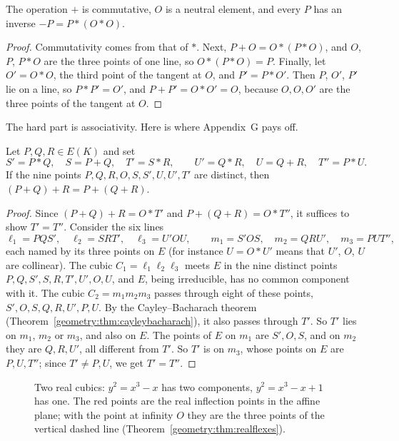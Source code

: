 \begin{proposition}\label{geometry:prop:groupbasic}
The operation $+$ is commutative, $O$ is a neutral element, and every $P$ has an inverse $-P=P*(O*O)$.
\end{proposition}

\begin{proof}
Commutativity comes from that of $*$. Next, $P+O=O*(P*O)$, and $O$, $P$, $P*O$ are the three points of one line, so $O*(P*O)=P$. Finally, let $O'=O*O$, the
third point of the tangent at $O$, and $P'=P*O'$. Then $P$, $O'$, $P'$ lie on a line, so $P*P'=O'$, and $P+P'=O*O'=O$, because $O,O,O'$ are the three points
of the tangent at $O$.
\end{proof}

The hard part is associativity. Here is where Appendix~G pays off.

\begin{theorem}[associativity]\label{geometry:thm:assoc}
Let $P,Q,R\in E(K)$ and set
\[
S'=P*Q,\quad S=P+Q,\quad T'=S*R,\qquad U'=Q*R,\quad U=Q+R,\quad T''=P*U.
\]
If the nine points $P,Q,R,O,S,S',U,U',T'$ are distinct, then $(P+Q)+R=P+(Q+R)$.
\end{theorem}

\begin{proof}
Since $(P+Q)+R=O*T'$ and $P+(Q+R)=O*T''$, it suffices to show $T'=T''$. Consider the six lines
\[
\ell_1=PQS',\quad \ell_2=SRT',\quad \ell_3=U'OU,\qquad m_1=S'OS,\quad m_2=QRU',\quad m_3=PUT'',
\]
each named by its three points on $E$ (for instance $U=O*U'$ means that $U'$, $O$, $U$ are collinear). The cubic $C_1=\ell_1\ell_2\ell_3$ meets $E$ in the nine
distinct points $P,Q,S',S,R,T',U',O,U$, and $E$, being irreducible, has no common component with it. The cubic $C_2=m_1m_2m_3$ passes through eight of these
points, $S',O,S,Q,R,U',P,U$. By the Cayley--Bacharach theorem (Theorem~\ref{geometry:thm:cayleybacharach}), it also passes through $T'$. So $T'$ lies on $m_1$, $m_2$
or $m_3$, and also on $E$. The points of $E$ on $m_1$ are $S',O,S$, and on $m_2$ they are $Q,R,U'$, all different from $T'$. So $T'$ is on $m_3$, whose points on
$E$ are $P,U,T''$; since $T'\ne P,U$, we get $T'=T''$.
\end{proof}

\begin{figure}[ht]
\centering
{}
\caption{Two real cubics: $y^2=x^3-x$ has two components, $y^2=x^3-x+1$ has one. The red points are the real inflection points in the affine plane; with
the point at infinity $O$ they are the three points of the vertical dashed line (Theorem~\ref{geometry:thm:realflexes}).}
\label{geometry:fig:realcubics}
\end{figure}

